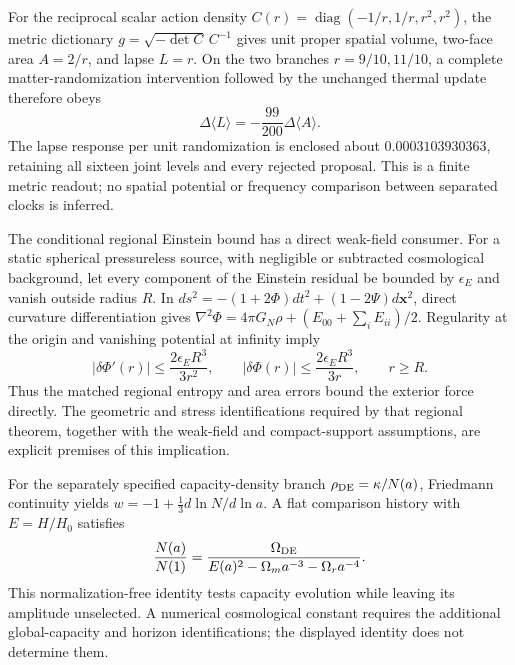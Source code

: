 For the reciprocal scalar action density
$C(r)=\operatorname{diag}(-1/r,1/r,r^2,r^2)$, the metric dictionary
$g=\sqrt{-\det C}\,C^{-1}$ gives unit proper spatial volume, two-face area
$A=2/r$, and lapse $L=r$.  On the two branches $r=9/10,11/10$, a complete
matter-randomization intervention followed by the unchanged thermal update
therefore obeys
\[
 \Delta\langle L\rangle=-\frac{99}{200}\Delta\langle A\rangle.
\]
The lapse response per unit randomization is enclosed about
$0.0003103930363$, retaining all sixteen joint levels and every rejected
proposal.  This is a finite metric readout; no spatial potential or
frequency comparison between separated clocks is inferred.

The conditional regional Einstein bound has a direct weak-field consumer.
For a static spherical pressureless source, with negligible or subtracted
cosmological background, let every component of the Einstein residual be
bounded by $\epsilon_E$ and vanish outside radius $R$.  In
$ds^2=-(1+2\Phi)dt^2+(1-2\Psi)d\mathbf x^2$, direct curvature
differentiation gives
$\nabla^2\Phi=4\pi G_N\rho+(E_{00}+\sum_iE_{ii})/2$.
Regularity at the origin and vanishing potential at infinity imply
\[
 |\delta\Phi'(r)|\le\frac{2\epsilon_E R^3}{3r^2},
 \qquad |\delta\Phi(r)|\le\frac{2\epsilon_E R^3}{3r},\qquad r\ge R.
\]
Thus the matched regional entropy and area errors bound the exterior
force directly.  The geometric and stress identifications required by
that regional theorem, together with the weak-field and compact-support
assumptions, are explicit premises of this implication.

For the separately specified capacity-density branch
$\rho_{\rm DE}=\kappa/N(a)$, Friedmann continuity yields
$w=-1+\tfrac13d\ln N/d\ln a$.  A flat comparison history with
$E=H/H_0$ satisfies
\[
 \frac{N(a)}{N(1)}=
 \frac{\Omega_{\rm DE}}
 {E(a)^2-\Omega_m a^{-3}-\Omega_r a^{-4}}.
\]
This normalization-free identity tests capacity evolution while leaving
its amplitude unselected.  A numerical cosmological constant requires
the additional global-capacity and horizon identifications; the displayed
identity does not determine them.
